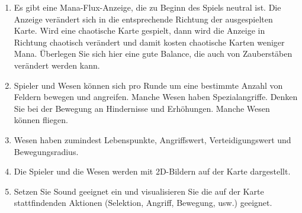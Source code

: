 \documentclass[a4paper,12pt]{scrartcl}
\begin{document}
\begin{enumerate}
		\item Es gibt eine Mana-Flux-Anzeige, die zu Beginn des Spiels neutral ist. Die Anzeige verändert sich in die entsprechende Richtung der ausgespielten Karte. Wird eine chaotische Karte gespielt, dann wird die Anzeige in Richtung chaotisch verändert und damit kosten chaotische Karten weniger Mana. Überlegen Sie sich hier eine gute Balance, die auch von Zauberstäben verändert werden kann.
		
		\item Spieler und Wesen können sich pro Runde um eine bestimmte Anzahl von Feldern bewegen und angreifen. Manche Wesen haben Spezialangriffe. Denken Sie bei der Bewegung an Hindernisse und Erhöhungen. Manche Wesen können fliegen.
		
		\item Wesen haben zumindest Lebenspunkte, Angriffswert, Verteidigungswert und Bewegungsradius.
		
		\item Die Spieler und die Wesen werden mit 2D-Bildern auf der Karte dargestellt.
		
		\item Setzen Sie Sound geeignet ein und visualisieren Sie die auf der Karte stattfindenden Aktionen (Selektion, Angriff, Bewegung, usw.) geeignet.
	\end{enumerate}
\end{document}
